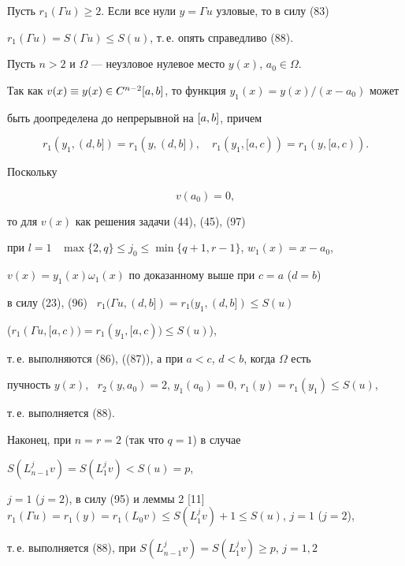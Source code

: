 \begin{pf}
Пусть $r_1(\Gamma u)\ge 2$. Если все нули $y=\Gamma u$ узловые, то в силу (83)


$r_1(\Gamma u)=S(\Gamma u)\le S(u)$, т.\,е. опять справедливо (88).





Пусть $n>2$ и $\Omega$ --- неузловое нулевое место $y(x)$, $a_0\in\Omega$.


Так как $v(x)\equiv y(x)\in C^{n-2}[a,b]$, то функция $y_1(x)=y(x)/(x-a_0)$ может


быть доопределена до непрерывной на $[a,b]$, причем


\begin{equation}


r_1(y_1,(d,b])=r_1(y,(d,b]),\quad r_1(y_1,[a,c))=r_1(y,[a,c)).


\end{equation}


Поскольку


\begin{equation}


v(a_0)=0,


\end{equation}


то для $v(x)$ как решения задачи (44), (45), (97)


при $l=1$ \ $\max{\{2,q\}}\le j_0\le \min{\{q+1,r-1\}}$, $w_1(x)=x-a_0$,


$v(x)=y_1(x)\omega_1(x)$ по доказанному выше при $c=a$ ($d=b$)


в силу (23), (96) \ $r_1(\Gamma u,(d,b])=r_1(y_1,(d,b])\le S(u)$


($r_1(\Gamma u,[a,c))=r_1(y_1,[a,c))\le S(u)$),


т.\,е. выполняются (86), ((87)), а при $a<c$, $d<b$, когда $\Omega$ есть


пучность $y(x)$, \ $r_2(y,a_0)=2$, $y_1(a_0)=0$, $r_1(y)=r_1(y_1)\le S(u)$,


т.\,е. выполняется (88).





Наконец, при $n=r=2$ (так что $q=1$) в случае


$S(L^j_{n-1}v)=S(L^j_1v)<S(u)=p$, 


$j=1$ ($j=2$), в силу (95) и леммы 2 [11] $r_1(\Gamma u)=


r_1(y)=r_1(L_0v)\le S(L^j_1v)+1\le S(u)$, $j=1$ ($j=2$),


т.\,е. выполняется (88), при $S(L^j_{n-1}v)=S(L^j_1v)\ge p$, $j=1,2$



\end{pf}
